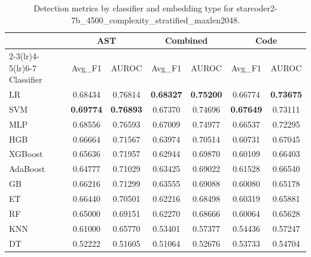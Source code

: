 \begin{table}[t]
\centering
\caption{Detection metrics by classifier and embedding type for starcoder2-7b\_4500\_complexity\_stratified\_maxlen2048.}
\label{tab:rq2d_starcoder2-7b_4500_complexity_stratified_maxlen2048}
\begin{tabular}{l cc cc cc}
\toprule
 & \multicolumn{2}{c}{AST} & \multicolumn{2}{c}{Combined} & \multicolumn{2}{c}{Code} \\
\cmidrule(lr){2-3}\cmidrule(lr){4-5}\cmidrule(lr){6-7}
Classifier & Avg\_F1 & AUROC & Avg\_F1 & AUROC & Avg\_F1 & AUROC \\
\midrule
LR & 0.68434 & 0.76814 & \textbf{0.68327} & \textbf{0.75200} & 0.66774 & \textbf{0.73675} \\
SVM & \textbf{0.69774} & \textbf{0.76893} & 0.67370 & 0.74696 & \textbf{0.67649} & 0.73111 \\
MLP & 0.68556 & 0.76593 & 0.67009 & 0.74977 & 0.66537 & 0.72295 \\
HGB & 0.66664 & 0.71567 & 0.63974 & 0.70514 & 0.60731 & 0.67045 \\
XGBoost & 0.65636 & 0.71957 & 0.62944 & 0.69870 & 0.60109 & 0.66403 \\
AdaBoost & 0.64777 & 0.71029 & 0.63425 & 0.69022 & 0.61528 & 0.66540 \\
GB & 0.66216 & 0.71299 & 0.63555 & 0.69088 & 0.60080 & 0.65178 \\
ET & 0.66440 & 0.70501 & 0.62216 & 0.68498 & 0.60319 & 0.65881 \\
RF & 0.65000 & 0.69151 & 0.62270 & 0.68666 & 0.60064 & 0.65628 \\
KNN & 0.61000 & 0.65770 & 0.53401 & 0.57377 & 0.54436 & 0.57247 \\
DT & 0.52222 & 0.51605 & 0.51064 & 0.52676 & 0.53733 & 0.54704 \\
\bottomrule
\end{tabular}
\end{table}
